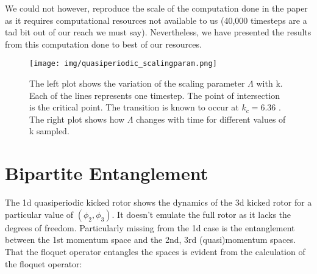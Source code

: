 \documentclass[twocolumn]{report}
\begin{document}
We could not however, reproduce the scale of the computation
done in the paper as it requires computational resources not
available to us (40,000 timesteps are a tad bit out of our reach
we must say). Nevertheless, we have presented the results
from this computation done to best of our resources.

\begin{figure}[t]
    \texttt{[image: img/quasiperiodic\_scalingparam.png]}
    \caption{The left plot shows the variation of the scaling parameter
    $\Lambda$ with k. Each of the lines represents one timestep. The point
    of intersection is the critical point. The transition is known to occur
    at $k_c = 6.36$ \cite{lemarie_universality_2009}. The right plot shows
    how $\Lambda$ changes with time for different values of k sampled.}
    \label{fig:scalingparam}
\end{figure}

\section{Bipartite Entanglement}
The 1d quasiperiodic kicked rotor shows the dynamics of the 3d kicked
rotor for a particular value of $(\phi_2,\phi_3)$. It doesn't emulate
the full rotor as it lacks the degrees of freedom. Particularly missing
from the 1d case is the entanglement between the 1st momentum space and
the 2nd, 3rd (quasi)momentum spaces. That the floquet operator entangles
the spaces is evident from the calculation of the floquet operator:
\end{document}
